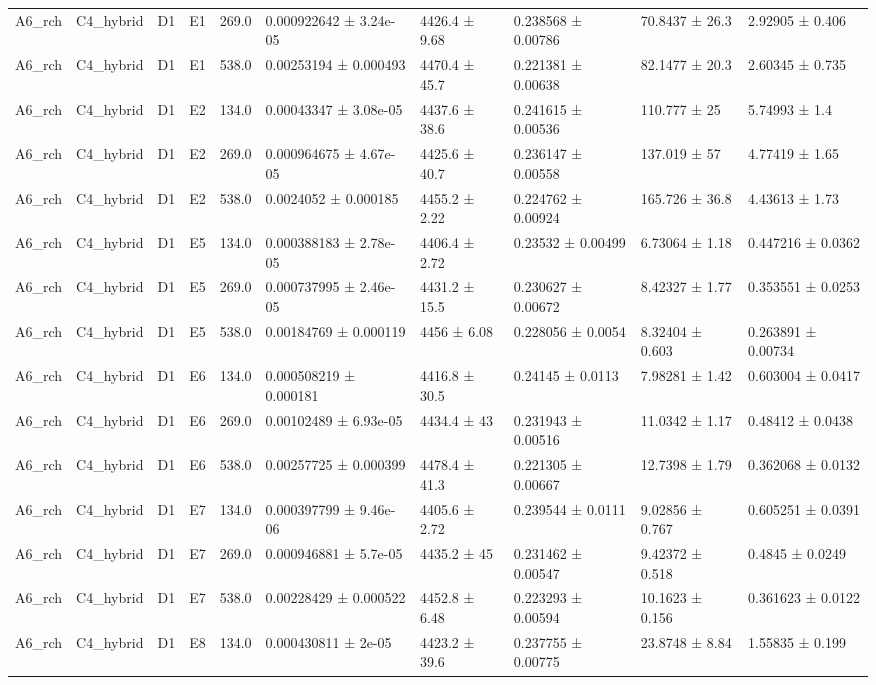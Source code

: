 \begin{table}
\begin{tabular}{llllllllll}
A6\_rch & C4\_hybrid & D1 & E1 & 269.0 & 0.000922642 ± 3.24e-05 & 4426.4 ± 9.68 & 0.238568 ± 0.00786 & 70.8437 ± 26.3 & 2.92905 ± 0.406 \\
A6\_rch & C4\_hybrid & D1 & E1 & 538.0 & 0.00253194 ± 0.000493 & 4470.4 ± 45.7 & 0.221381 ± 0.00638 & 82.1477 ± 20.3 & 2.60345 ± 0.735 \\
A6\_rch & C4\_hybrid & D1 & E2 & 134.0 & 0.00043347 ± 3.08e-05 & 4437.6 ± 38.6 & 0.241615 ± 0.00536 & 110.777 ± 25 & 5.74993 ± 1.4 \\
A6\_rch & C4\_hybrid & D1 & E2 & 269.0 & 0.000964675 ± 4.67e-05 & 4425.6 ± 40.7 & 0.236147 ± 0.00558 & 137.019 ± 57 & 4.77419 ± 1.65 \\
A6\_rch & C4\_hybrid & D1 & E2 & 538.0 & 0.0024052 ± 0.000185 & 4455.2 ± 2.22 & 0.224762 ± 0.00924 & 165.726 ± 36.8 & 4.43613 ± 1.73 \\
A6\_rch & C4\_hybrid & D1 & E5 & 134.0 & 0.000388183 ± 2.78e-05 & 4406.4 ± 2.72 & 0.23532 ± 0.00499 & 6.73064 ± 1.18 & 0.447216 ± 0.0362 \\
A6\_rch & C4\_hybrid & D1 & E5 & 269.0 & 0.000737995 ± 2.46e-05 & 4431.2 ± 15.5 & 0.230627 ± 0.00672 & 8.42327 ± 1.77 & 0.353551 ± 0.0253 \\
A6\_rch & C4\_hybrid & D1 & E5 & 538.0 & 0.00184769 ± 0.000119 & 4456 ± 6.08 & 0.228056 ± 0.0054 & 8.32404 ± 0.603 & 0.263891 ± 0.00734 \\
A6\_rch & C4\_hybrid & D1 & E6 & 134.0 & 0.000508219 ± 0.000181 & 4416.8 ± 30.5 & 0.24145 ± 0.0113 & 7.98281 ± 1.42 & 0.603004 ± 0.0417 \\
A6\_rch & C4\_hybrid & D1 & E6 & 269.0 & 0.00102489 ± 6.93e-05 & 4434.4 ± 43 & 0.231943 ± 0.00516 & 11.0342 ± 1.17 & 0.48412 ± 0.0438 \\
A6\_rch & C4\_hybrid & D1 & E6 & 538.0 & 0.00257725 ± 0.000399 & 4478.4 ± 41.3 & 0.221305 ± 0.00667 & 12.7398 ± 1.79 & 0.362068 ± 0.0132 \\
A6\_rch & C4\_hybrid & D1 & E7 & 134.0 & 0.000397799 ± 9.46e-06 & 4405.6 ± 2.72 & 0.239544 ± 0.0111 & 9.02856 ± 0.767 & 0.605251 ± 0.0391 \\
A6\_rch & C4\_hybrid & D1 & E7 & 269.0 & 0.000946881 ± 5.7e-05 & 4435.2 ± 45 & 0.231462 ± 0.00547 & 9.42372 ± 0.518 & 0.4845 ± 0.0249 \\
A6\_rch & C4\_hybrid & D1 & E7 & 538.0 & 0.00228429 ± 0.000522 & 4452.8 ± 6.48 & 0.223293 ± 0.00594 & 10.1623 ± 0.156 & 0.361623 ± 0.0122 \\
A6\_rch & C4\_hybrid & D1 & E8 & 134.0 & 0.000430811 ± 2e-05 & 4423.2 ± 39.6 & 0.237755 ± 0.00775 & 23.8748 ± 8.84 & 1.55835 ± 0.199 \\

\end{tabular}
\end{table}
